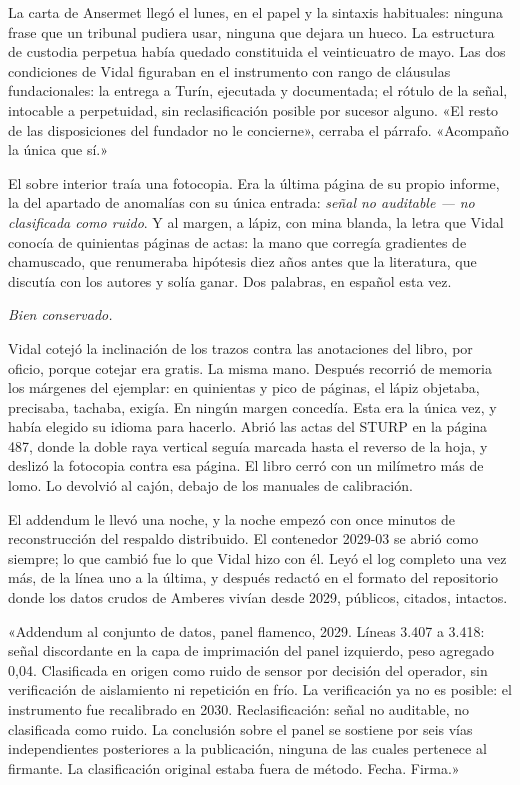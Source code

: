 La carta de Ansermet llegó el lunes, en el papel y la sintaxis habituales: ninguna frase que un tribunal pudiera usar, ninguna que dejara un hueco. La estructura de custodia perpetua había quedado constituida el veinticuatro de mayo. Las dos condiciones de Vidal figuraban en el instrumento con rango de cláusulas fundacionales: la entrega a Turín, ejecutada y documentada; el rótulo de la señal, intocable a perpetuidad, sin reclasificación posible por sucesor alguno. «El resto de las disposiciones del fundador no le concierne», cerraba el párrafo. «Acompaño la única que sí.»

El sobre interior traía una fotocopia. Era la última página de su propio informe, la del apartado de anomalías con su única entrada: \textit{señal no auditable --- no clasificada como ruido}. Y al margen, a lápiz, con mina blanda, la letra que Vidal conocía de quinientas páginas de actas: la mano que corregía gradientes de chamuscado, que renumeraba hipótesis diez años antes que la literatura, que discutía con los autores y solía ganar. Dos palabras, en español esta vez.

\textit{Bien conservado.}

Vidal cotejó la inclinación de los trazos contra las anotaciones del libro, por oficio, porque cotejar era gratis. La misma mano. Después recorrió de memoria los márgenes del ejemplar: en quinientas y pico de páginas, el lápiz objetaba, precisaba, tachaba, exigía. En ningún margen concedía. Esta era la única vez, y había elegido su idioma para hacerlo. Abrió las actas del STURP en la página 487, donde la doble raya vertical seguía marcada hasta el reverso de la hoja, y deslizó la fotocopia contra esa página. El libro cerró con un milímetro más de lomo. Lo devolvió al cajón, debajo de los manuales de calibración.


\scenebreak


El addendum le llevó una noche, y la noche empezó con once minutos de reconstrucción del respaldo distribuido. El contenedor 2029-03 se abrió como siempre; lo que cambió fue lo que Vidal hizo con él. Leyó el log completo una vez más, de la línea uno a la última, y después redactó en el formato del repositorio donde los datos crudos de Amberes vivían desde 2029, públicos, citados, intactos.

«Addendum al conjunto de datos, panel flamenco, 2029. Líneas 3.407 a 3.418: señal discordante en la capa de imprimación del panel izquierdo, peso agregado 0,04. Clasificada en origen como ruido de sensor por decisión del operador, sin verificación de aislamiento ni repetición en frío. La verificación ya no es posible: el instrumento fue recalibrado en 2030. Reclasificación: señal no auditable, no clasificada como ruido. La conclusión sobre el panel se sostiene por seis vías independientes posteriores a la publicación, ninguna de las cuales pertenece al firmante. La clasificación original estaba fuera de método. Fecha. Firma.»

